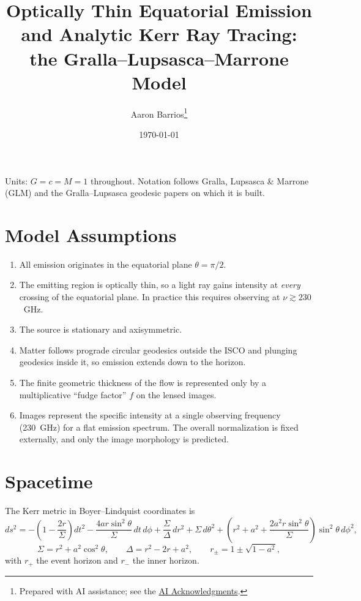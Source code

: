 \documentclass[11pt]{article}
\title{Optically Thin Equatorial Emission and Analytic Kerr Ray Tracing:\\
the Gralla--Lupsasca--Marrone Model}
\author{Aaron Barrios\thanks{Prepared with AI assistance; see the \hyperref[sec:ai]{AI Acknowledgments}.}}
\date{\today}
\begin{document}
\maketitle

\noindent Units: $G = c = M = 1$ throughout. Notation follows
Gralla, Lupsasca \& Marrone (GLM) \cite{GLM2020} and the Gralla--Lupsasca
geodesic papers \cite{GL2020lensing,GL2020null} on which it is built.

\section{Model Assumptions}

\begin{enumerate}
  \item All emission originates in the equatorial plane $\theta = \pi/2$.
  \item The emitting region is optically thin, so a light ray gains intensity
        at \emph{every} crossing of the equatorial plane. In practice this
        requires observing at $\nu \gtrsim 230$~GHz.
  \item The source is stationary and axisymmetric.
  \item Matter follows prograde circular geodesics outside the ISCO and
        plunging geodesics inside it, so emission extends down to the horizon.
  \item The finite geometric thickness of the flow is represented only by a
        multiplicative ``fudge factor'' $f$ on the lensed images.
  \item Images represent the specific intensity at a single observing
        frequency (230~GHz) for a flat emission spectrum. The overall
        normalization is fixed externally, and only the image morphology is
        predicted.
\end{enumerate}

\section{Spacetime}

The Kerr metric in Boyer--Lindquist coordinates is
\begin{equation}
ds^2 = -\left(1-\frac{2r}{\Sigma}\right)dt^2
       - \frac{4ar\sin^2\theta}{\Sigma}\,dt\,d\phi
       + \frac{\Sigma}{\Delta}\,dr^2 + \Sigma\,d\theta^2
       + \left(r^2+a^2+\frac{2a^2r\sin^2\theta}{\Sigma}\right)\sin^2\theta\,d\phi^2,
\end{equation}
\begin{equation}
\Sigma = r^2 + a^2\cos^2\theta, \qquad \Delta = r^2 - 2r + a^2, \qquad
r_\pm = 1 \pm \sqrt{1 - a^2},
\end{equation}
with $r_+$ the event horizon and $r_-$ the inner horizon.
\end{document}
